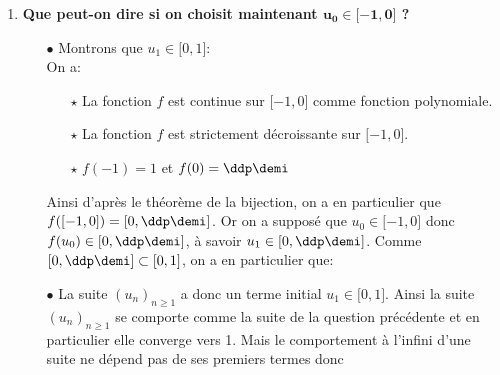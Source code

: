 \begin{correction}
\begin{enumerate}
\begin{itemize}
\begin{itemize}
\end{itemize}
\item[$\bullet$]  \textbf{\'Etude de la monotonie de la suite:}\\
\noindent Soit $n\in\N$, on a: $u_{n+1}-u_n=f(u_n)-u_n=g(u_n)$. Ainsi comme le signe de $g$ est positif sur $\R$, on obtient que pour tout $n\in\N$: $u_{n+1}-u_n\geq 0$. Ainsi 
\item[$\bullet$]  \textbf{\'Etude de la convergence de la suite:}
\begin{itemize}
\item[$\star$] La suite $\suiteu$ est croissante et major\'ee par 1 donc d'apr\`{e}s le th\'eor\`{e}me sur les suites monotones, elle converge.
\item[$\star$] Comme la seule limite \'eventuelle est 1, 
\end{itemize}
\end{itemize}
\item \textbf{Que peut-on dire si on choisit maintenant $\mathbf{u_0\in\lbrack -1,0\rbrack}$ ?}
\begin{itemize}
\item[$\bullet$] Montrons que $u_1\in\lbrack 0,1\rbrack$:\\
\noindent On a:
\begin{itemize}
\item[$\star$] La fonction $f$ est continue sur $\lbrack -1,0\rbrack$ comme fonction polynomiale.
\item[$\star$] La fonction $f$ est strictement d\'ecroissante sur $\lbrack -1,0\rbrack$.
\item[$\star$] $f(-1)=1$ et $f(0)=\ddp\demi$
\end{itemize}
Ainsi d'apr\`{e}s le th\'eor\`{e}me de la bijection, on a en particulier que $f(\lbrack -1,0\rbrack)=\left\lbrack 0,\ddp\demi\right\rbrack$. Or on a suppos\'e que $u_0\in\lbrack -1,0\rbrack$ donc $f(u_0)\in \left\lbrack 0,\ddp\demi\right\rbrack$, \`{a} savoir $u_1\in \left\lbrack 0,\ddp\demi\right\rbrack$. Comme $\left\lbrack 0,\ddp\demi\right\rbrack\subset \lbrack 0,1\rbrack$, on a en particulier que: 
\item[$\bullet$] La suite $(u_n)_{n\geq 1}$ a donc un terme initial $u_1\in\lbrack 0,1\rbrack$. Ainsi la suite $(u_n)_{n\geq 1}$ se comporte comme la suite de la question pr\'ec\'edente et en particulier elle converge vers 1. Mais le comportement \`{a} l'infini d'une suite ne d\'epend pas de ses premiers termes donc 
\end{itemize}
\end{enumerate}
\end{correction}